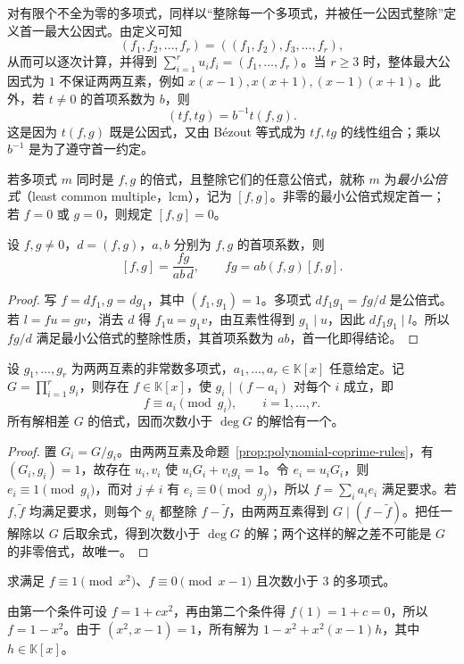 对有限个不全为零的多项式，同样以“整除每一个多项式，并被任一公因式整除”定义首一最大公因式。由定义可知
\[
    (f_1,f_2,\ldots,f_r)=((f_1,f_2),f_3,\ldots,f_r),
\]
从而可以逐次计算，并得到 $\sum_{i=1}^r u_if_i=(f_1,\ldots,f_r)$。当 $r\geq3$ 时，整体最大公因式为 $1$ 不保证两两互素，例如 $x(x-1),x(x+1),(x-1)(x+1)$。此外，若 $t\ne0$ 的首项系数为 $b$，则
\[
    (tf,tg)=b^{-1}t(f,g).
\]
这是因为 $t(f,g)$ 既是公因式，又由 Bézout 等式成为 $tf,tg$ 的线性组合；乘以 $b^{-1}$ 是为了遵守首一约定。

\begin{definition}
若多项式 $m$ 同时是 $f,g$ 的倍式，且整除它们的任意公倍式，就称 $m$ 为\emph{最小公倍式}（least common multiple，lcm），记为 $[f,g]$。非零的最小公倍式规定首一；若 $f=0$ 或 $g=0$，则规定 $[f,g]=0$。
\end{definition}

\begin{proposition}
\label{prop:polynomial-lcm}
设 $f,g\ne0$，$d=(f,g)$，$a,b$ 分别为 $f,g$ 的首项系数，则
\[
    [f,g]=\frac{fg}{ab\,d},\qquad fg=ab(f,g)[f,g].
\]
\end{proposition}
\begin{proof}
写 $f=df_1,g=dg_1$，其中 $(f_1,g_1)=1$。多项式 $df_1g_1=fg/d$ 是公倍式。若 $l=fu=gv$，消去 $d$ 得 $f_1u=g_1v$，由互素性得到 $g_1\mid u$，因此 $df_1g_1\mid l$。所以 $fg/d$ 满足最小公倍式的整除性质，其首项系数为 $ab$，首一化即得结论。
\end{proof}

\begin{theorem}[多项式的中国剩余定理]
\label{thm:polynomial-crt}
设 $g_1,\ldots,g_r$ 为两两互素的非常数多项式，$a_1,\ldots,a_r\in\mathbb K[x]$ 任意给定。记 $G=\prod_{i=1}^r g_i$，则存在 $f\in\mathbb K[x]$，使 $g_i\mid(f-a_i)$ 对每个 $i$ 成立，即
\[
    f\equiv a_i\pmod{g_i},\qquad i=1,\ldots,r.
\]
所有解相差 $G$ 的倍式，因而次数小于 $\deg G$ 的解恰有一个。
\end{theorem}
\begin{proof}
置 $G_i=G/g_i$。由两两互素及命题~\ref{prop:polynomial-coprime-rules}，有 $(G_i,g_i)=1$，故存在 $u_i,v_i$ 使 $u_iG_i+v_ig_i=1$。令 $e_i=u_iG_i$，则 $e_i\equiv1\pmod{g_i}$，而对 $j\ne i$ 有 $e_i\equiv0\pmod{g_j}$，所以 $f=\sum_i a_ie_i$ 满足要求。若 $f,\widetilde f$ 均满足要求，则每个 $g_i$ 都整除 $f-\widetilde f$，由两两互素得到 $G\mid(f-\widetilde f)$。把任一解除以 $G$ 后取余式，得到次数小于 $\deg G$ 的解；两个这样的解之差不可能是 $G$ 的非零倍式，故唯一。
\end{proof}

\begin{example}
求满足 $f\equiv1\pmod{x^2}$、$f\equiv0\pmod{x-1}$ 且次数小于 $3$ 的多项式。
\end{example}
\begin{solve}
由第一个条件可设 $f=1+cx^2$，再由第二个条件得 $f(1)=1+c=0$，所以 $f=1-x^2$。由于 $(x^2,x-1)=1$，所有解为 $1-x^2+x^2(x-1)h$，其中 $h\in\mathbb K[x]$。
\end{solve}


